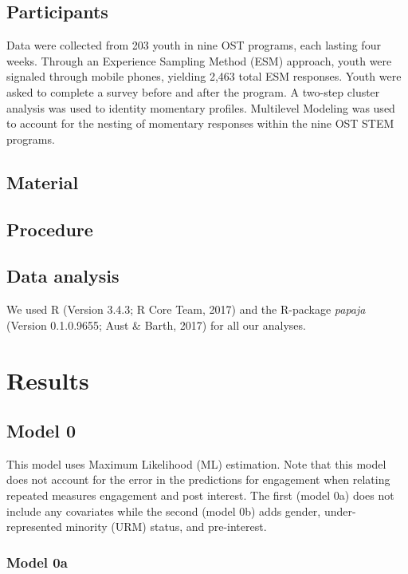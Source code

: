\documentclass[man]{apa6}
\theoremstyle{definition}
\theoremstyle{definition}
\theoremstyle{definition}
\theoremstyle{remark}
\begin{document}
\subsection{Participants}\label{participants}

Data were collected from 203 youth in nine OST programs, each lasting
four weeks. Through an Experience Sampling Method (ESM) approach, youth
were signaled through mobile phones, yielding 2,463 total ESM responses.
Youth were asked to complete a survey before and after the program. A
two-step cluster analysis was used to identity momentary profiles.
Multilevel Modeling was used to account for the nesting of momentary
responses within the nine OST STEM programs.

\subsection{Material}\label{material}

\subsection{Procedure}\label{procedure}

\subsection{Data analysis}\label{data-analysis}

We used R (Version 3.4.3; R Core Team, 2017) and the R-package
\emph{papaja} (Version 0.1.0.9655; Aust \& Barth, 2017) for all our
analyses.

\section{Results}\label{results}

\subsection{Model 0}\label{model-0}

This model uses Maximum Likelihood (ML) estimation. Note that this model
does not account for the error in the predictions for engagement when
relating repeated measures engagement and post interest. The first
(model 0a) does not include any covariates while the second (model 0b)
adds gender, under-represented minority (URM) status, and pre-interest.

\subsubsection{Model 0a}\label{model-0a}
\end{document}
